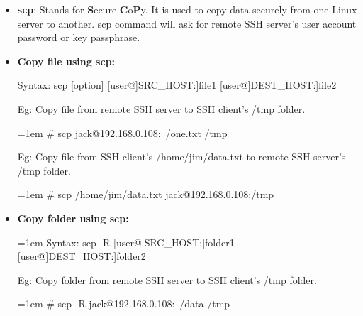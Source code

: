 \setlength{\columnsep}{3pt}
\begin{flushleft}

\bigskip
\begin{itemize}
	\item \textbf{scp}: Stands for \textbf{S}ecure \textbf{C}o\textbf{P}y. It is used to copy data securely from one Linux server to another.
	\newline
	scp command will ask for remote SSH server's user account password or key passphrase.
	\bigskip
		
	\item \textbf{Copy file using scp:}
	\begin{tcolorbox}[breakable,notitle,boxrule=0pt,colback=pink,colframe=pink]
		\color{black}

		Syntax: scp [option] [user@]SRC\_HOST:]file1 [user@]DEST\_HOST:]file2

	\end{tcolorbox}
	
	\bigskip
	
	Eg: Copy file from remote SSH server to SSH client's /tmp folder.
	\begin{tcolorbox}[breakable,notitle,boxrule=-0pt,colback=black,colframe=black]
		\color{green}
		\font=1em
		\# scp jack@192.168.0.108:~/one.txt  /tmp
		\font=4pt
	\end{tcolorbox}

	\bigskip
	
	Eg: Copy file from SSH client's /home/jim/data.txt to remote SSH server's /tmp folder.
	\begin{tcolorbox}[breakable,notitle,boxrule=-0pt,colback=black,colframe=black]
		\color{green}
		\font=1em
		\# scp  /home/jim/data.txt  jack@192.168.0.108:/tmp
		\font=4pt
	\end{tcolorbox}

	\bigskip
	\bigskip
	\item \textbf{Copy folder using scp:}
	\begin{tcolorbox}[breakable,notitle,boxrule=0pt,colback=pink,colframe=pink]
		\color{black}
		\font=1em
		Syntax: scp -R [user@]SRC\_HOST:]folder1 [user@]DEST\_HOST:]folder2
		\font=4pt
	\end{tcolorbox}

	\bigskip

	Eg: Copy folder from remote SSH server to SSH client's /tmp folder.
	\begin{tcolorbox}[breakable,notitle,boxrule=-0pt,colback=black,colframe=black]
		\color{green}
		\font=1em
		\# scp -R jack@192.168.0.108:~/data  /tmp
		\font=4pt
	\end{tcolorbox}
	

\end{itemize}
\end{flushleft}
